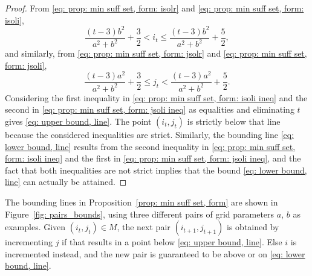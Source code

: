 \documentclass[12pt, a4paper]{article}
\newcommand{\tiles}{t} %
\newcommand{\mss}{M}
\begin{document}
\begin{proof}
From \eqref{eq: prop: min suff set, form: isolr} and \eqref{eq: prop: min suff set, form: isoli},
\begin{equation}
\label{eq: prop: min suff set, form: isoli ineq}
\frac{(t-3)b^2}{a^2+b^2} + \frac 3 2 < i_\tiles \leq \frac{(t-3)b^2}{a^2+b^2} + \frac 5 2,
\end{equation}
and similarly, from \eqref{eq: prop: min suff set, form: jsolr} and \eqref{eq: prop: min suff set, form: jsoli},
\begin{equation}
\label{eq: prop: min suff set, form: jsoli ineq}
\frac{(t-3)a^2}{a^2+b^2} + \frac 3 2 \leq j_\tiles < \frac{(t-3)a^2}{a^2+b^2} + \frac 5 2.
\end{equation}
Considering the first inequality in \eqref{eq: prop: min suff set, form: isoli ineq} and the second in \eqref{eq: prop: min suff set, form: jsoli ineq} as equalities and eliminating $\tiles$ gives \eqref{eq: upper bound, line}. The point $(i_\tiles, j_\tiles)$ is strictly below that line because the considered inequalities are strict. Similarly, the bounding line \eqref{eq: lower bound, line} results from the second inequality in \eqref{eq: prop: min suff set, form: isoli ineq} and the first in \eqref{eq: prop: min suff set, form: jsoli ineq}, and the fact that both inequalities are not strict implies that the bound \eqref{eq: lower bound, line} can actually be attained.
\end{proof}

The bounding lines in Proposition~\ref{prop: min suff set, form} are shown in Figure~\ref{fig: pairs_bounds}, using three different pairs of grid parameters $a$, $b$ as examples. Given $(i_\tiles,j_\tiles) \in \mss$, the next pair $(i_{\tiles+1},j_{\tiles+1})$ is obtained by incrementing $j$ if that results in a point below \eqref{eq: upper bound, line}. Else $i$ is incremented instead, and the new pair is guaranteed to be above or on \eqref{eq: lower bound, line}.
\end{document}
